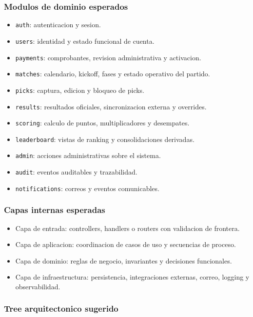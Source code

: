 \subsubsection{Modulos de dominio esperados}

\begin{itemize}
  \item \texttt{auth}: autenticacion y sesion.
  \item \texttt{users}: identidad y estado funcional de cuenta.
  \item \texttt{payments}: comprobantes, revision administrativa y activacion.
  \item \texttt{matches}: calendario, kickoff, fases y estado operativo del partido.
  \item \texttt{picks}: captura, edicion y bloqueo de picks.
  \item \texttt{results}: resultados oficiales, sincronizacion externa y overrides.
  \item \texttt{scoring}: calculo de puntos, multiplicadores y desempates.
  \item \texttt{leaderboard}: vistas de ranking y consolidaciones derivadas.
  \item \texttt{admin}: acciones administrativas sobre el sistema.
  \item \texttt{audit}: eventos auditables y trazabilidad.
  \item \texttt{notifications}: correos y eventos comunicables.
\end{itemize}

\subsubsection{Capas internas esperadas}

\begin{itemize}
  \item Capa de entrada: controllers, handlers o routers con validacion de frontera.
  \item Capa de aplicacion: coordinacion de casos de uso y secuencias de proceso.
  \item Capa de dominio: reglas de negocio, invariantes y decisiones funcionales.
  \item Capa de infraestructura: persistencia, integraciones externas, correo, logging y observabilidad.
\end{itemize}

\subsubsection{Tree arquitectonico sugerido}

